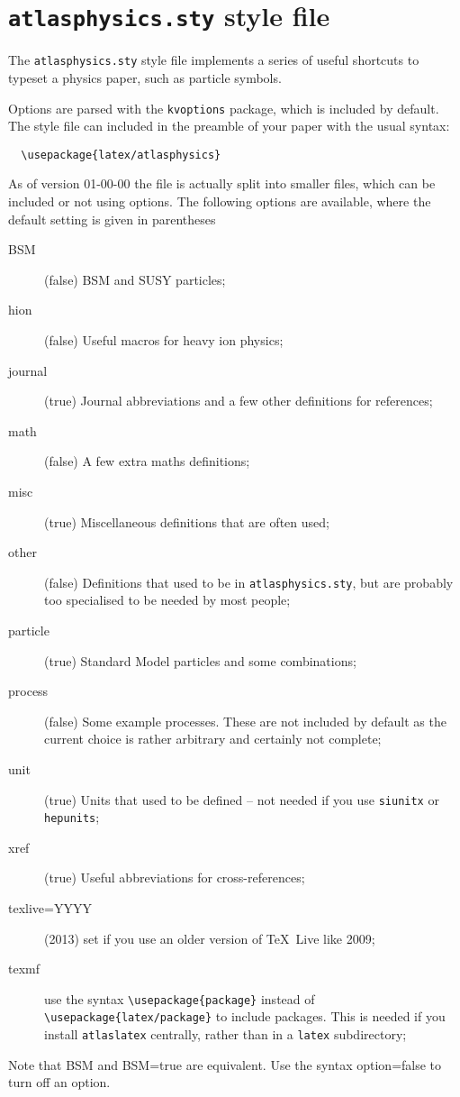 \documentclass[UKenglish,texlive=2014]{latex/atlasdoc}
\author{Ian C. Brock}
\affil{University of Bonn}
\newcommand{\File}[1]{\texttt{#1}\xspace}
\newcommand{\Macro}[1]{\texttt{\textbackslash #1}\xspace}
\newcommand{\Option}[1]{\textsf{#1}\xspace}
\newcommand{\Package}[1]{\texttt{#1}\xspace}
\begin{document}
\tableofcontents

\section{\File{atlasphysics.sty} style file}
\label{sec:atlasphysics}

The \File{atlasphysics.sty} style file implements a series of useful
shortcuts to typeset a physics paper, such as particle
symbols.

Options are parsed with the \Package{kvoptions} package, which is included by default.
The style file can included in the preamble of your paper with the usual
syntax:
%
\begin{verbatim}
  \usepackage{latex/atlasphysics}
\end{verbatim}
%
As of version 01-00-00 the file is actually split into smaller files,
which can be included or not using options.
The following options are available, where the default setting is given in parentheses
\begin{description}
\item[BSM](false) BSM and SUSY particles;
\item[hion](false) Useful macros for heavy ion physics;
\item[journal](true) Journal abbreviations and a few other definitions for references;
\item[math](false) A few extra maths definitions;
\item[misc](true) Miscellaneous definitions that are often used;
\item[other](false) Definitions that used to be in \File{atlasphysics.sty}, 
  but are probably too specialised to be needed by most people;
\item[particle](true) Standard Model particles and some combinations;
\item[process](false) Some example processes. 
  These are not included by default as the current choice is rather arbitrary
  and certainly not complete;
\item[unit](true) Units that used to be defined -- not needed if you use \Package{siunitx} or \Package{hepunits};
\item[xref](true) Useful abbreviations for cross-references;
\item[texlive=YYYY](2013) set if you use an older version of \TeX\ Live like 2009;
\item[texmf] use the syntax \Macro{usepackage\{package\}}
  instead of \Macro{usepackage\{latex/package\}} to include packages.
  This is needed if you install \Package{atlaslatex} centrally,
  rather than in a \File{latex} subdirectory;
\end{description}
Note that \Option{BSM} and \Option{BSM=true} are equivalent.
Use the syntax \Option{option=false} to turn off an option.
\end{document}
